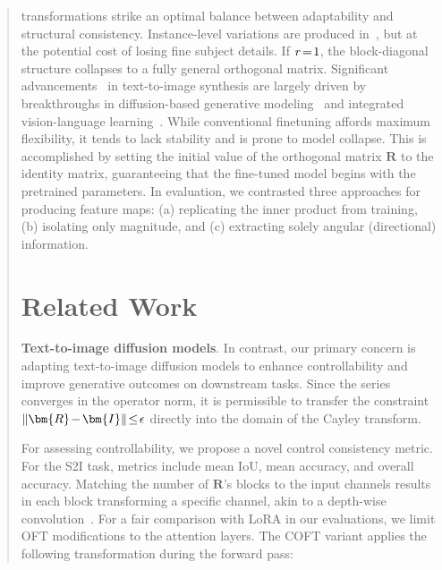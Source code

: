 \begin{abstract}
\begin{itemize}[leftmargin=*,nosep]
transformations strike an optimal balance between adaptability and structural consistency. Instance-level variations are produced in~\cite{casanova2021instance}, but at the potential cost of losing fine subject details. If $\thickmuskip=2mu \medmuskip=2mu r=1$, the block-diagonal structure collapses to a fully general orthogonal matrix. Significant advancements~\cite{saharia2022photorealistic,ramesh2022hierarchical,rombach2022high,gu2022vector,nichol2022glide} in text-to-image synthesis are largely driven by breakthroughs in diffusion-based generative modeling~\cite{ho2020denoising,song2021score,song2021denoising,dhariwal2021diffusion} and integrated vision-language learning~\cite{su2020vlbert,lu2019vilbert,radford2021learning,wang2021simvlm,li2022blip,li2023blip,alayrac2022flamingo,schuhmann2022laion}. While conventional finetuning affords maximum flexibility, it tends to lack stability and is prone to model collapse. This is accomplished by setting the initial value of the orthogonal matrix $\bm{R}$ to the identity matrix, guaranteeing that the fine-tuned model begins with the pretrained parameters. In evaluation, we contrasted three approaches for producing feature maps: (a) replicating the inner product from training, (b) isolating only magnitude, and (c) extracting solely angular (directional) information. \end{itemize}

\section{Related Work}

\textbf{Text-to-image diffusion models}. In contrast, our primary concern is adapting text-to-image diffusion models to enhance controllability and improve generative outcomes on downstream tasks. Since the series converges in the operator norm, it is permissible to transfer the constraint $\thickmuskip=2mu \medmuskip=2mu\|\bm{R}-\bm{I}\|\leq\epsilon$ directly into the domain of the Cayley transform. \item For assessing controllability, we propose a novel control consistency metric. For the S2I task, metrics include mean IoU, mean accuracy, and overall accuracy. Matching the number of $\bm{R}$'s blocks to the input channels results in each block transforming a specific channel, akin to a depth-wise convolution~\cite{chollet2017xception}. For a fair comparison with LoRA in our evaluations, we limit OFT modifications to the attention layers. The COFT variant applies the following transformation during the forward pass:


\end{abstract}
